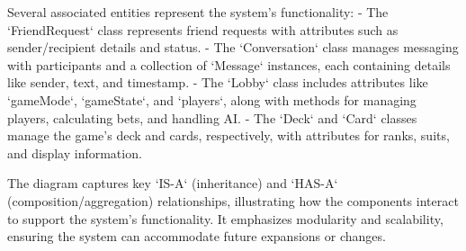 Several associated entities represent the system’s functionality:
- The `FriendRequest` class represents friend requests with attributes such as sender/recipient details and status.
- The `Conversation` class manages messaging with participants and a collection of `Message` instances, each containing details like sender, text, and timestamp.
- The `Lobby` class includes attributes like `gameMode`, `gameState`, and `players`, along with methods for managing players, calculating bets, and handling AI.
- The `Deck` and `Card` classes manage the game’s deck and cards, respectively, with attributes for ranks, suits, and display information.

The diagram captures key `IS-A` (inheritance) and `HAS-A` (composition/aggregation) relationships, illustrating how the components interact to support the system’s functionality. It emphasizes modularity and scalability, ensuring the system can accommodate future expansions or changes.

